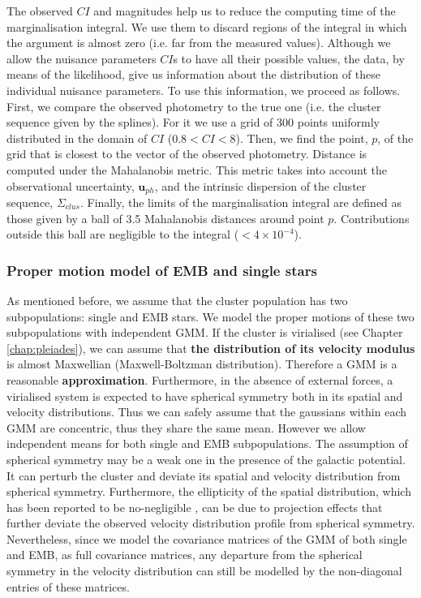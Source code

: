 The observed $CI$ and magnitudes help us  to reduce the computing time of the marginalisation integral. We use them to discard  regions of the integral in which the argument is almost zero (i.e. far from the measured values). Although we allow the nuisance parameters $CI$s to have all their possible values, the data, by means of the likelihood, give us information about the distribution of these individual nuisance parameters. To use this information, we proceed as follows. First, we compare the observed photometry to the true one (i.e. the cluster sequence given by the splines). For it we use a grid of 300 points uniformly distributed in the domain of $CI$ ($0.8<CI<8$). Then, we find the point, $p$, of the grid that is closest to the vector of the observed photometry.  Distance is computed under  the Mahalanobis metric. This metric takes into account the observational uncertainty, $\mathbf{u}_{ph}$, and the intrinsic dispersion of the cluster sequence, $\Sigma_{clus}$. Finally, the limits of the marginalisation integral  are defined as those given by a ball of 3.5 Mahalanobis distances around point $p$. Contributions outside this ball are negligible to the integral ($< 4\times10^{-4}$).

\subsubsection{Proper motion model of EMB and single stars}
As mentioned before, we assume that the cluster population has two subpopulations: single and EMB stars.
We model the proper motions of these two subpopulations with independent GMM. If the cluster is virialised (see Chapter \ref{chap:pleiades}), we can assume that\textbf{ the distribution of its velocity modulus} is almost Maxwellian (Maxwell-Boltzman distribution). Therefore a GMM is a reasonable \textbf{approximation}. Furthermore, in the absence of external forces, a virialised system is expected to have spherical symmetry both in its spatial and velocity distributions. Thus we can safely assume that the gaussians within each GMM are concentric, thus they share the same mean. However we allow independent means for both single and EMB subpopulations. The assumption of spherical symmetry may be a weak one in the presence of the galactic potential. It can perturb the cluster and deviate its spatial and velocity distribution from spherical symmetry. Furthermore, the ellipticity of the spatial distribution, which has been reported to be no-negligible \cite[$\epsilon=0.17$, according to ][]{Raboud1998}, can be due to projection effects that further deviate the observed velocity distribution profile from spherical symmetry. Nevertheless, since we model the covariance matrices of the GMM of both single and EMB, as full covariance matrices, any departure from the spherical symmetry in the velocity distribution can still be modelled by the non-diagonal entries of these matrices.


